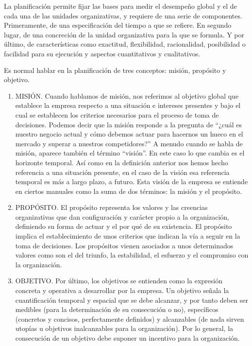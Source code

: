 \documentclass[
]{krantz}
\providecommand{\tightlist}{%
  \setlength{\itemsep}{0pt}\setlength{\parskip}{0pt}}
\begin{document}
La planificación permite fijar las bases para medir el desempeño global y el de cada una de las unidades organizativas, y requiere de una serie de componentes. Primeramente, de una especificación del tiempo a que se refiere. En segundo lugar, de una concreción de la unidad organizativa para la que se formula. Y por último, de características como exactitud, flexibilidad, racionalidad, posibilidad o facilidad para su ejecución y aspectos cuantitativos y cualitativos.

Es normal hablar en la planificación de tres conceptos: misión, propósito y objetivo.

\begin{enumerate}
\def\labelenumi{\arabic{enumi}.}
\tightlist
\item
  MISIÓN. Cuando hablamos de misión, nos referimos al objetivo global que establece la empresa respecto a una situación e intereses presentes y bajo el cual se establecen los criterios necesarios para el proceso de toma de decisiones. Podemos decir que la misión responde a la pregunta de ``¿cuál es nuestro negocio actual y cómo debemos actuar para hacernos un hueco en el mercado y superar a nuestros competidores?''
  A menudo cuando se habla de misión, aparece también el término ``visión''. En este caso lo que cambia es el horizonte temporal. Así como en la definición anterior nos hemos hecho referencia a una situación presente, en el caso de la visión esa referencia temporal es más a largo plazo, a futuro. Esta visión de la empresa se entiende en ciertos manuales como la suma de dos términos: la misión y el propósito.
\item
  PROPÓSITO. El propósito representa los valores y las creencias organizativas que dan configuración y carácter propio a la organización, definiendo su forma de actuar y el por qué de su existencia. El propósito implica el establecimiento de unos criterios que indican la vía a seguir en la toma de decisiones. Los propósitos vienen asociados a unos determinados valores como son el del triunfo, la estabilidad, el esfuerzo y el compromiso con la organización.
\item
  OBJETIVO. Por último, los objetivos se entienden como la expresión concreta y operativa a desarrollar por la empresa. Un objetivo señala la cuantificación temporal y espacial que se debe alcanzar, y por tanto deben ser medibles (para la determinación de su consecución o no), específicos (concretos y concisos, perfectamente definidos) y alcanzables (de nada sirven utopías u objetivos inalcanzables para la organización). Por lo general, la consecución de un objetivo debe suponer un incentivo para la organización.
\end{enumerate}
\end{document}
